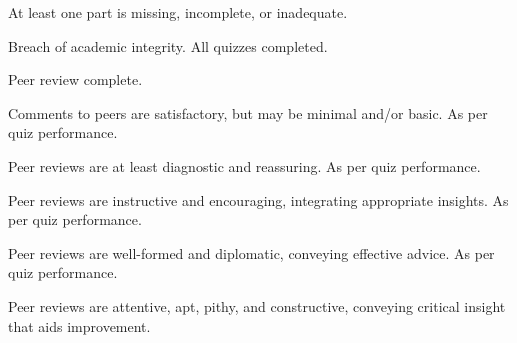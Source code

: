 \documentclass{../../fal_assignment}
\begin{document}
\begin{markingrubric}
%
        \grade \fail At least one part is missing, incomplete, or inadequate.
                   \par Breach of academic integrity.    
        \grade  All quizzes completed. \par Peer review complete. \par Comments to peers are satisfactory, but may be minimal and/or basic. %
        \grade  As per quiz performance. \par Peer reviews are at least diagnostic and reassuring.  %
        \grade  As per quiz performance.  \par Peer reviews are instructive and encouraging, integrating appropriate insights. %
        \grade  As per quiz performance.  \par Peer reviews are well-formed and diplomatic, conveying effective advice. %
        \grade  As per quiz performance.  \par Peer reviews are attentive, apt, pithy, and constructive, conveying critical insight that aids improvement. %
%


\end{markingrubric}
\end{document}

